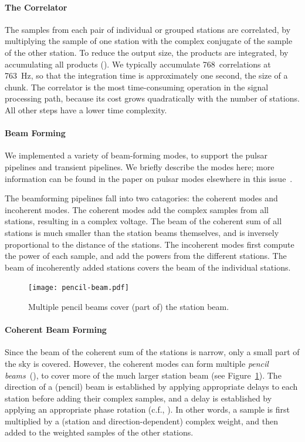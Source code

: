 \paragraph{The Correlator }
The samples from each pair of individual or grouped stations are
correlated, by multiplying the sample of one station with the complex conjugate
of the sample of the other station.
To reduce the output size, the products are integrated, by accumulating all
products ().
We typically accumulate 768~correlations at 763~Hz, so that the integration
time is approximately one second, the size of a chunk.
The correlator is the most time-consuming operation in the signal
processing path, because its cost grows quadratically with the number of
stations.
All other steps have a lower time complexity.


\paragraph{Beam Forming}
\label{sec:beam-forming}
We implemented a variety of beam-forming modes, to support the pulsar pipelines
and transient pipelines.
We briefly describe the modes here; more information can be found in the
paper on pulsar modes elsewhere in this issue~\cite{Hessels:10}.

The beamforming pipelines fall into two catagories: the coherent modes and
incoherent modes.
The coherent modes add the complex samples from all stations, resulting in a
complex voltage.
The beam of the coherent sum of all stations is much smaller than the station
beams themselves, and is inversely proportional to the distance of the stations.
The incoherent modes first compute the power of each sample, and add the
powers from the different stations.
The beam of incoherently added stations covers the beam of the individual
stations.


\begin{figure}
\vspace{-9mm}
\begin{center}
\texttt{[image: pencil-beam.pdf]}
\end{center}
\caption{Multiple pencil beams cover (part of) the station beam.\vspace{-5mm}}
\label{fig:pencil-beams}
\end{figure}
\paragraph{Coherent Beam Forming}
Since the beam of the coherent sum of the stations is narrow, only a small
part of the sky is covered.
However, the coherent modes can form multiple
\emph{pencil beams\/}~(), to cover more of the much larger
station beam (see Figure~\ref{fig:pencil-beams}).
The direction of a (pencil) beam is established by applying appropriate
delays to each station before adding their complex samples, and a delay is
established by applying an appropriate phase rotation (c.f., ).
In other words, a sample is first multiplied by a (station and
direction-dependent) complex weight, and then added to the weighted samples
of the other stations.

